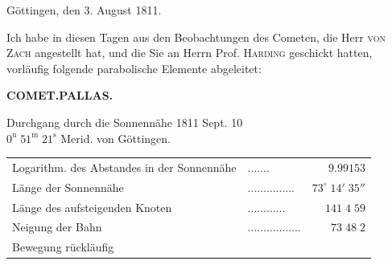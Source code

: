 \begin{flushright}Göttingen, den 3. August 1811.\end{flushright}
\par\indent Ich habe in diesen Tagen aus den Beobachtungen des Cometen, die Herr \textsc{von Zach} angestellt hat, und die Sie an Herrn Prof. \textsc{Harding} geschickt hatten, vorläufig folgende parabolische Elemente abgeleitet:
\clearpage
\endgroup
\begingroup
\pagestyle{empty}
\newcommand{\GaussVICitation}[2]{%
  \begin{center}
  \parbox{#1\linewidth}{%
    \centering\footnotesize\frenchspacing
    \hrule height .3pt\relax\vspace{2.5pt}
    #2\par
    \vspace{2.5pt}\hrule height .3pt\relax
  }%
  \end{center}
  \par\nobreak\medskip
}
\newcommand{\GaussVIGathering}[2]{%
  \fancypagestyle{gaussVIGathering}{%
    \fancyhf{}%
    \renewcommand{\headrulewidth}{0pt}%
    \renewcommand{\footrulewidth}{0pt}%
    \fancyfoot[C]{\makebox[\textwidth][l]{%
      \hspace*{.025\textwidth}{\footnotesize\bfseries #1}\hfill
      {\normalsize\bfseries\textls[90]{#2}}\hspace*{.18\textwidth}}}%
  }%
  \thispagestyle{gaussVIGathering}%
}
\thispagestyle{empty}
\noindent{}%
\makebox[12mm][l]{}%
\parbox[t]{\dimexpr\linewidth-24mm\relax}{\centering\footnotesize\bfseries COMET.\quad PALLAS.\par}%
\par\nobreak\medskip
\begin{center}\fontsize{10}{12}\selectfont Durchgang durch die Sonnennähe 1811 Sept. 10\\$0^{\text{u}}\;51^{\text{m}}\;21^{\text{s}}$ Merid. von Göttingen.\end{center}

\begin{center}\fontsize{10}{12}\selectfont\setlength{\tabcolsep}{4pt}\renewcommand{\arraystretch}{1.15}\begin{tabular}{llr}
Logarithm. des Abstandes in der Sonnennähe & .\;.\;.\;.\;.\;.\;. & $9.99153$\\
Länge der Sonnennähe & .\;.\;.\;.\;.\;.\;.\;.\;.\;.\;.\;.\;.\;.\;. & $73^\circ\;14'\;35''$\\
Länge des aufsteigenden Knoten & .\;.\;.\;.\;.\;.\;.\;.\;.\;.\;.\;. & $141\;4\;59$\\
Neigung der Bahn & .\;.\;.\;.\;.\;.\;.\;.\;.\;.\;.\;.\;.\;.\;.\;.\;. & $73\;48\;2$\\
Bewegung rückläufig &  & \\
\end{tabular}\end{center}

